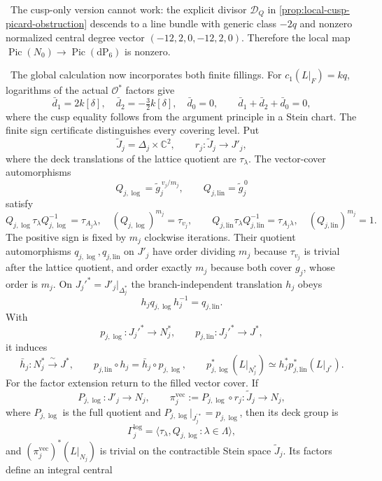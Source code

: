 \begin{auditrecord}
\Verified\ The cusp-only version cannot work: the explicit divisor
$\mathcal D_Q$ in \cref{prop:local-cusp-picard-obstruction} descends to a
line bundle with generic class $-2q$ and nonzero normalized central degree
vector $(-12,2,0,-12,2,0)$.  Therefore the local map
$\operatorname{Pic}(N_0)\to\operatorname{Pic}(\mathrm{dP}_6)$ is nonzero.

\Verified\ The global calculation now incorporates both finite fillings.
For $c_1(L|_F)=kq$, logarithms of the actual $\mathcal O^*$ factors give
\[
 \bar d_1=2k[\delta],\quad
 \bar d_2=-\tfrac32k[\delta],\quad
 \bar d_0=0,\qquad
 \bar d_1+\bar d_2+\bar d_0=0,
\]
where the cusp equality follows from the argument principle in a Stein chart.
The finite sign certificate distinguishes every covering level.  Put
\[
 \widetilde J_j=\Delta_j\times\mathbb C^2,\qquad
 r_j:\widetilde J_j\longrightarrow J'_j,
\]
where the deck translations of the lattice quotient are $\tau_\lambda$.
The vector-cover automorphisms
\[
 Q_{j,\log}=\widetilde g_j^{\,v_j/m_j},\qquad
 Q_{j,\mathrm{lin}}=\widetilde g_j^{\,0}
\]
satisfy
\[
 Q_{j,\log}\tau_\lambda Q_{j,\log}^{-1}=\tau_{A_j\lambda},
 \quad (Q_{j,\log})^{m_j}=\tau_{v_j},\qquad
 Q_{j,\mathrm{lin}}\tau_\lambda Q_{j,\mathrm{lin}}^{-1}=\tau_{A_j\lambda},
 \quad (Q_{j,\mathrm{lin}})^{m_j}=1.
\]
 The positive sign is fixed by $m_j$ clockwise iterations.  Their quotient
 automorphisms $q_{j,\log},q_{j,\mathrm{lin}}$ on $J'_j$ have order dividing
 $m_j$ because $\tau_{v_j}$ is trivial after the lattice quotient, and order
 exactly $m_j$ because both cover $g_j$, whose order is $m_j$.
On $J_j'^*=J'_j|_{\Delta_j^*}$ the branch-independent translation $h_j$
obeys
\[
 h_jq_{j,\log}h_j^{-1}=q_{j,\mathrm{lin}}.
\]
With
\[
 p_{j,\log}:J_j'^*\to N_j^*,\qquad
 p_{j,\mathrm{lin}}:J_j'^*\to J^*,
\]
it induces
\[
 \bar h_j:N_j^*\xrightarrow{\ \sim\ }J^*,\qquad
 p_{j,\mathrm{lin}}\circ h_j=\bar h_j\circ p_{j,\log},\qquad
 p_{j,\log}^*(L|_{N_j^*})
 \simeq h_j^*p_{j,\mathrm{lin}}^*(L|_{J^*}).
\]
For the factor extension return to the filled vector cover.  If
\[
 P_{j,\log}:J'_j\to N_j,\qquad
 \pi_j^{\mathrm{vec}}:=P_{j,\log}\circ r_j:\widetilde J_j\to N_j,
\]
where \(P_{j,\log}\) is the full quotient and
\(P_{j,\log}|_{J_j^{\prime *}}=p_{j,\log}\), then its deck group is
\[
 \Gamma_j^{\log}
 =\langle\tau_\lambda,Q_{j,\log}:\lambda\in\Lambda\rangle,
\]
and $(\pi_j^{\mathrm{vec}})^*(L|_{N_j})$ is trivial on the contractible
Stein space $\widetilde J_j$.  Its factors define an integral central

\end{auditrecord}
